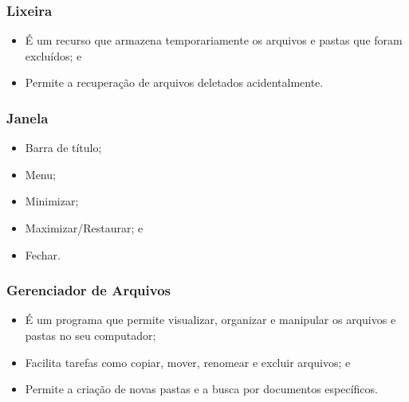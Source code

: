 \documentclass[aspectratio=169]{beamer} %
\begin{document}
\begin{frame}
	\frametitle{Lixeira}
	
	\begin{itemize}
		\item É um recurso que armazena temporariamente os arquivos e pastas que foram excluídos; e
		\item Permite a recuperação de arquivos deletados acidentalmente.
	\end{itemize}
\end{frame}

\begin{frame}
	\frametitle{Janela}
	
	\begin{itemize}
		\item Barra de título;
		\item Menu;
		\item Minimizar;
		\item Maximizar/Restaurar; e
		\item Fechar.
	\end{itemize}
\end{frame}

\begin{frame}
	\frametitle{Gerenciador de Arquivos}
	
	\begin{itemize}
		\item É um programa que permite visualizar, organizar e manipular os arquivos e pastas no seu computador;
		\item Facilita tarefas como copiar, mover, renomear e excluir arquivos; e
		\item Permite a criação de novas pastas e a busca por documentos específicos.
	\end{itemize}
\end{frame}
\end{document}
